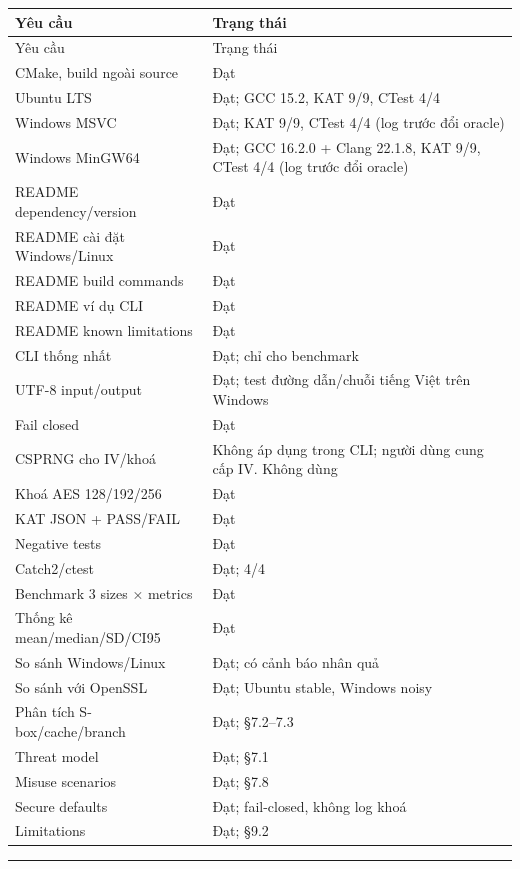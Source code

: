 \documentclass[12pt,a4paper,oneside]{report}
\let\origtexttt\texttt
\renewcommand{\texttt}[1]{\origtexttt{\seqsplit{#1}}}
\begin{document}
\begin{longtable}{p{}p{}}
\toprule
Yêu cầu & Trạng thái \\
\midrule
\endfirsthead
\toprule
Yêu cầu & Trạng thái \\
\midrule
\endhead
CMake, build ngoài source & Đạt \\
Ubuntu LTS & Đạt; GCC 15.2, KAT 9/9, CTest 4/4 \\
Windows MSVC & Đạt; KAT 9/9, CTest 4/4 (log trước đổi oracle) \\
Windows MinGW64 & Đạt; GCC 16.2.0 + Clang 22.1.8, KAT 9/9, CTest 4/4 (log trước đổi oracle) \\
README dependency/version & Đạt \\
README cài đặt Windows/Linux & Đạt \\
README build commands & Đạt \\
README ví dụ CLI & Đạt \\
README known limitations & Đạt \\
CLI thống nhất & Đạt; \texttt{--threads} chỉ cho benchmark \\
UTF-8 input/output & Đạt; test đường dẫn/chuỗi tiếng Việt trên Windows \\
Fail closed & Đạt \\
CSPRNG cho IV/khoá & Không áp dụng trong CLI; người dùng cung cấp IV. Không dùng \texttt{rand()} \\
Khoá AES 128/192/256 & Đạt \\
KAT JSON + PASS/FAIL & Đạt \\
Negative tests & Đạt \\
Catch2/ctest & Đạt; 4/4 \\
Benchmark 3 sizes × metrics & Đạt \\
Thống kê mean/median/SD/CI95 & Đạt \\
So sánh Windows/Linux & Đạt; có cảnh báo nhân quả \\
So sánh với OpenSSL & Đạt; Ubuntu stable, Windows noisy \\
Phân tích S-box/cache/branch & Đạt; §7.2–7.3 \\
Threat model & Đạt; §7.1 \\
Misuse scenarios & Đạt; §7.8 \\
Secure defaults & Đạt; fail-closed, không log khoá \\
Limitations & Đạt; §9.2 \\
\bottomrule
\end{longtable}


\par\noindent\rule{\textwidth}{0.4pt}
\end{document}
